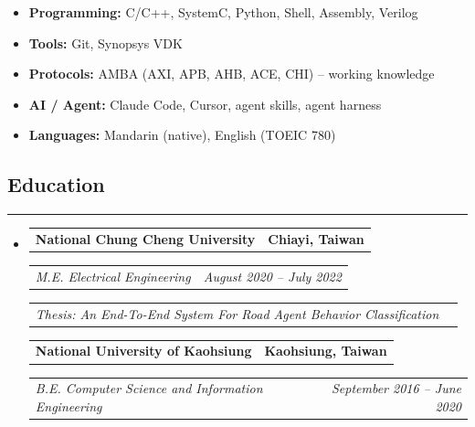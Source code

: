 \documentclass[11pt,a4paper]{article}
\makeatletter
\newcommand{\headerrow}[2]
{\begin{tabular*}{\linewidth}{l@{\extracolsep{\fill}}r}
#1 &
#2 \\
\end{tabular*}}
\makeatother
\begin{document}
\begin{itemize}[leftmargin=1em,noitemsep]
	\item \textbf{Programming:}
	      C/C++, SystemC, Python, Shell, Assembly, Verilog
	\item \textbf{Tools:}
	       Git, Synopsys VDK
	\item \textbf{Protocols:}
	      AMBA (AXI, APB, AHB, ACE, CHI) -- working knowledge
	\item \textbf{AI / Agent:}
	      Claude Code, Cursor, agent skills, agent harness
    \item \textbf{Languages:}
            Mandarin (native), English (TOEIC 780)
          
\end{itemize}
\subsection*{\Large Education}
\hrule
\vspace{1em}

\begin{itemize}[leftmargin=1em]
	\parskip=0.1em
		
	\item
	      \headerrow
	      {\textbf{National Chung Cheng University}}
	      {\textbf{Chiayi, Taiwan}}
	      \headerrow
	      {\emph{M.E. Electrical Engineering} %
            }
	      {\emph{August 2020 -- July 2022}}
            \headerrow
            {\emph{Thesis: An End-To-End System For Road Agent Behavior Classification}}
            {\emph{}}
          
	      \headerrow
            {\textbf{National University of Kaohsiung}}
	      {\textbf{Kaohsiung, Taiwan}}
            \headerrow
	      {\emph{B.E. Computer Science and Information Engineering} %
            }
	      {\emph{September 2016 -- June 2020}}
	      	      
\end{itemize}

		
\end{document}
